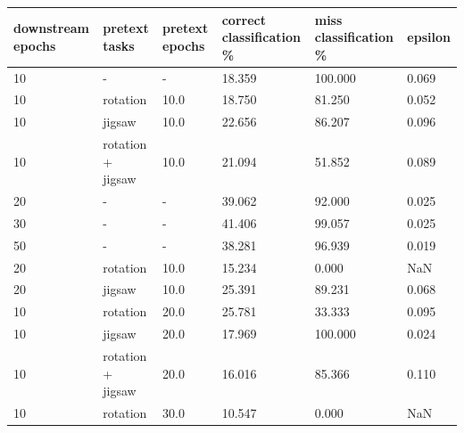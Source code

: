 \begin{longtable}{|| p{} | p{} | p{} | p{} | p{} | p{} ||}
    \hline \hline
    downstream epochs & pretext tasks     & pretext epochs & correct classification \% & miss classification \% & epsilon\\
    \hline \hline
    10                & -                 & -              & 18.359                    & 100.000                & 0.069   \\ \hline
    10                & rotation          & 10.0           & 18.750                    & 81.250                 & 0.052   \\ \hline
    10                & jigsaw            & 10.0           & 22.656                    & 86.207                 & 0.096   \\ \hline
    10                & rotation + jigsaw & 10.0           & 21.094                    & 51.852                 & 0.089   \\ \hline
    20                & -                 & -              & 39.062                    & 92.000                 & 0.025   \\ \hline
    30                & -                 & -              & 41.406                    & 99.057                 & 0.025   \\ \hline
    50                & -                 & -              & 38.281                    & 96.939                 & 0.019   \\ \hline
    20                & rotation          & 10.0           & 15.234                    & 0.000                  & NaN     \\ \hline
    20                & jigsaw            & 10.0           & 25.391                    & 89.231                 & 0.068   \\ \hline
    10                & rotation          & 20.0           & 25.781                    & 33.333                 & 0.095   \\ \hline
    10                & jigsaw            & 20.0           & 17.969                    & 100.000                & 0.024   \\ \hline
    \rowcolor{yellow}
    10                & rotation + jigsaw & 20.0           & 16.016                    & 85.366                 & 0.110   \\ \hline
    10                & rotation          & 30.0           & 10.547                    & 0.000                  & NaN     \\ \hline

\end{longtable}
